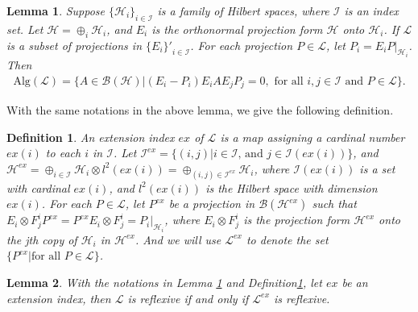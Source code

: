 \documentclass{amsart}
\newcommand{\B}{\mathcal B}
\newcommand{\HHH}{\mathcal H} %
\newcommand{\LLL}{\mathcal L} %
\newcommand{\Alg}{\mathrm{Alg}}
\newtheorem{lemma}{Lemma}[section]
\newtheorem{df}{Definition}[section]
\begin{document}
\begin{lemma}\label{alemma2}
Suppose $\{\HHH_{i} \}_{i \in \mathcal{I}}$ is a family of Hilbert spaces, where $\mathcal{I}$ is an index set. 
Let $\HHH = \oplus_{i} \HHH_i$, and $E_i$ is the orthonormal projection form $\HHH$ onto $\HHH_i$.
If $\LLL$ is a subset of projections in $ {\{E_i\}'}_{i \in \mathcal{I}}$. For each projection $P \in \LLL$, let
$P_{i} = E_{i}P |_{\HHH_i}$. Then
\begin{align*}
\Alg(\LLL) = \{ A  \in  \B(\HHH) | (E_i - P_{i})E_i A E_j P_{j} = 0, \mbox{ for all } i, j \in \mathcal{I} \mbox{ and } P \in \LLL \}.
\end{align*}
\end{lemma}

With the same notations in the above lemma, we give the following definition.

\begin{df}\label{adef1}
An extension index $ex$ of $\LLL$ is a map assigning a cardinal number $ex(i) $ to each $i$ in $\mathcal{I}$.
Let $\mathcal{I}^{ex} = \{ (i, j) | i \in \mathcal{I} \mbox{, and } j \in \mathcal{I}(ex(i)) \}$, and 
 $\HHH^{ex} = \oplus_{i \in \mathcal{I}}\HHH_{i}\otimes l^{2}(ex(i)) = \oplus_{(i,j) \in \mathcal{I}^{ex}} \HHH_{i}$,
where $\mathcal{I}(ex(i))$ is a set with cardinal $ex(i)$, and 
$ l^{2}(ex(i))$ is the Hilbert space with dimension $ex(i)$.
For each $P \in \LLL$, let $P^{ex}$ be a projection in $\B(\HHH^{ex})$ such that $E_{i} \otimes F_{j}^{i} P^{ex} = P^{ex}E_{i} \otimes F_{j}^{i} = P_i |_{\HHH_{i}}$, 
where $E_{i} \otimes F_{j}^{i}$ is the projection form $\HHH^{ex}$ onto the jth copy of $\HHH_{i}$ in $\HHH^{ex}$. 
And we will use $\LLL^{ex}$  to denote the set $\{ P^{ex} | \mbox{for all } P \in \LLL \}$.
\end{df}

\begin{lemma}\label{alemma3}
With the notations in Lemma \ref{alemma2} and Definition\ref{adef1}, let $ex$ be an extension index, then 
$\LLL$ is reflexive if and only if $\LLL^{ex}$ is reflexive.
\end{lemma}
\end{document}
